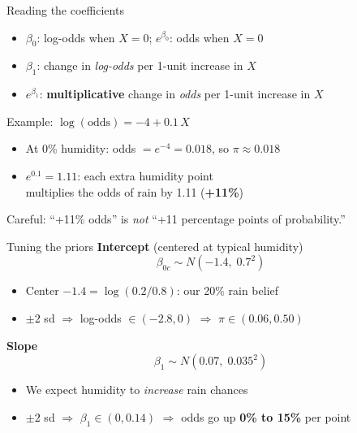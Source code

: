 \documentclass[aspectratio=43,11pt]{beamer}
\newcommand{\hl}[1]{\textcolor{warm}{\textbf{#1}}}
\begin{document}
\begin{frame}{Reading the coefficients}
  \begin{itemize}
    \setlength\itemsep{0.5em}
    \item $\beta_0$: log-odds when $X = 0$; \quad $e^{\beta_0}$: odds when $X=0$
    \item $\beta_1$: change in \emph{log-odds} per 1-unit increase in $X$
    \item $e^{\beta_1}$: \hl{multiplicative} change in \emph{odds} per 1-unit increase in $X$
  \end{itemize}
  \vspace{0.5em}
  \begin{exampleblock}{Example: $\log(\text{odds}) = -4 + 0.1\,X$}
    \begin{itemize}
      \item At 0\% humidity: odds $= e^{-4} = 0.018$, so $\pi \approx 0.018$
      \item $e^{0.1} = 1.11$: each extra humidity point \\
            multiplies the odds of rain by 1.11 (\hl{+11\%})
    \end{itemize}
  \end{exampleblock}
  \vspace{0.3em}
  \small\color{gray} Careful: ``+11\% odds'' is \emph{not} ``+11 percentage points of probability.''
\end{frame}

\begin{frame}{Tuning the priors}
  \textbf{Intercept} (centered at typical humidity)
  \[ \beta_{0c} \sim N(-1.4,\; 0.7^2) \]
  \vspace{-0.6em}
  \begin{itemize}
    \item Center $-1.4 = \log(0.2/0.8)$: our 20\% rain belief
    \item $\pm 2$ sd $\Rightarrow$ log-odds $\in(-2.8, 0)$ $\Rightarrow$ $\pi \in (0.06, 0.50)$
  \end{itemize}
  \vspace{0.3em}
  \textbf{Slope}
  \[ \beta_1 \sim N(0.07,\; 0.035^2) \]
  \vspace{-0.6em}
  \begin{itemize}
    \item We expect humidity to \emph{increase} rain chances
    \item $\pm 2$ sd $\Rightarrow$ $\beta_1 \in (0, 0.14)$ $\Rightarrow$ odds go up \hl{0\% to 15\%} per point
  \end{itemize}
\end{frame}
\end{document}
